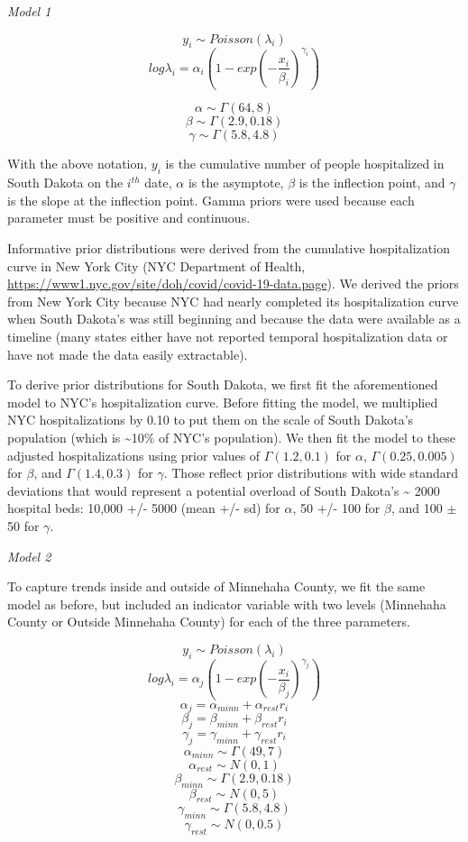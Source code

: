 \documentclass[
]{article}
\begin{document}
\emph{Model 1}

\[y_i \sim Poisson(\lambda_i)\]
\[log\lambda_i = \alpha_i\left(1 - exp\left(-\frac{x_i}{\beta_i}\right)^{\gamma_i}\right)\]

\[\alpha \sim \Gamma(64,8)\]
\[\beta \sim \Gamma(2.9, 0.18)\]
\[\gamma \sim \Gamma(5.8,4.8)\]

With the above notation, \(y_i\) is the cumulative number of people hospitalized in South Dakota on the \(i^{th}\) date, \(\alpha\) is the asymptote, \(\beta\) is the inflection point, and \(\gamma\) is the slope at the inflection point. Gamma priors were used because each parameter must be positive and continuous.

Informative prior distributions were derived from the cumulative hospitalization curve in New York City (NYC Department of Health, \url{https://www1.nyc.gov/site/doh/covid/covid-19-data.page}). We derived the priors from New York City because NYC had nearly completed its hospitalization curve when South Dakota's was still beginning and because the data were available as a timeline (many states either have not reported temporal hospitalization data or have not made the data easily extractable).

To derive prior distributions for South Dakota, we first fit the aforementioned model to NYC's hospitalization curve. Before fitting the model, we multiplied NYC hospitalizations by 0.10 to put them on the scale of South Dakota's population (which is \textasciitilde10\% of NYC's population). We then fit the model to these adjusted hospitalizations using prior values of \(\Gamma(1.2, 0.1)\) for \(\alpha\), \(\Gamma(0.25, 0.005)\) for \(\beta\), and \(\Gamma(1.4, 0.3)\) for \(\gamma\). Those reflect prior distributions with wide standard deviations that would represent a potential overload of South Dakota's \textasciitilde{} 2000 hospital beds: 10,000 +/- 5000 (mean +/- sd) for \(\alpha\), 50 +/- 100 for \(\beta\), and 100 \(\pm\) 50 for \(\gamma\).

\emph{Model 2}

To capture trends inside and outside of Minnehaha County, we fit the same model as before, but included an indicator variable with two levels (Minnehaha County or Outside Minnehaha County) for each of the three parameters.

\[y_i \sim Poisson(\lambda_i)\]
\[log\lambda_i = \alpha_j\left(1 - exp\left(-\frac{x_i}{\beta_j}\right)^{\gamma_j}\right)\]
\[\alpha_j = \alpha_{minn} + \alpha_{rest}r_i\]
\[\beta_j = \beta_{minn} + \beta_{rest}r_i\]
\[\gamma_j = \gamma_{minn} + \gamma_{rest}r_i\]
\[\alpha_{minn} \sim \Gamma(49,7)\]
\[\alpha_{rest} \sim N(0,1)\]
\[\beta_{minn} \sim \Gamma(2.9, 0.18)\]
\[\beta_{rest} \sim N(0, 5)\]
\[\gamma_{minn} \sim \Gamma(5.8, 4.8)\]
\[\gamma_{rest} \sim N(0,0.5)\]
\end{document}
